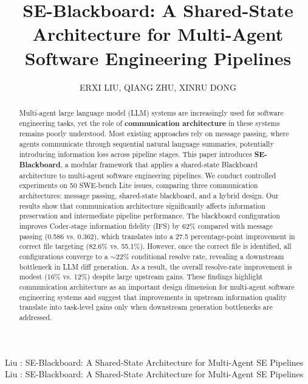 \documentclass{ieeeaccess}
\begin{document}
\doi{} %

\title{SE-Blackboard: A Shared-State Architecture for Multi-Agent Software Engineering Pipelines}
\author{\uppercase{Erxi Liu},
\uppercase{Qiang Zhu},
\uppercase{Xinru Dong}}

\address[1]{Tandon School of Engineering, New York University, New York, United States (e-mail: el4435@nyu.edu)}
\address[2]{The National Institute of Metrology of China, Beijing, China (e-mail: zhuqiang@nim.ac.cn)}
\address[3]{School of Mechanical and Electrical Engineering, Beijing Institute of Graphic Communication, Beijing, China (e-mail: 18339301370@163.com)}

\markboth
{Liu \headeretal: SE-Blackboard: A Shared-State Architecture for Multi-Agent SE Pipelines}
{Liu \headeretal: SE-Blackboard: A Shared-State Architecture for Multi-Agent SE Pipelines}


\begin{abstract}
Multi-agent large language model (LLM) systems are increasingly used for software engineering tasks, yet the role of \textbf{communication architecture} in these systems remains poorly understood. Most existing approaches rely on message passing, where agents communicate through sequential natural language summaries, potentially introducing information loss across pipeline stages. This paper introduces \textbf{SE-Blackboard}, a modular framework that applies a shared-state Blackboard architecture to multi-agent software engineering pipelines. We conduct controlled experiments on 50 SWE-bench Lite issues, comparing three communication architectures: message passing, shared-state blackboard, and a hybrid design. Our results show that communication architecture significantly affects information preservation and intermediate pipeline performance. The blackboard configuration improves Coder-stage information fidelity (IFS) by 62\% compared with message passing (0.586 vs. 0.362), which translates into a 27.5 percentage-point improvement in correct file targeting (82.6\% vs. 55.1\%). However, once the correct file is identified, all configurations converge to a $\sim$22\% conditional resolve rate, revealing a downstream bottleneck in LLM diff generation. As a result, the overall resolve-rate improvement is modest (16\% vs. 12\%) despite large upstream gains. These findings highlight communication architecture as an important design dimension for multi-agent software engineering systems and suggest that improvements in upstream information quality translate into task-level gains only when downstream generation bottlenecks are addressed.
\end{abstract}
\end{document}

